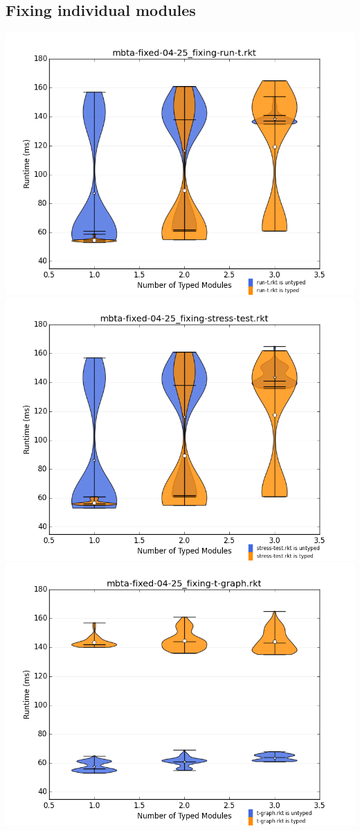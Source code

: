 \documentclass{article}
\begin{document}
\subsection{Fixing individual modules}
\includegraphics[width=\textwidth]{mbta-fixed-04-25_fixing-run-t.rkt-dv.png}
\includegraphics[width=\textwidth]{mbta-fixed-04-25_fixing-stress-test.rkt-dv.png}
\includegraphics[width=\textwidth]{mbta-fixed-04-25_fixing-t-graph.rkt-dv.png}
\end{document}
